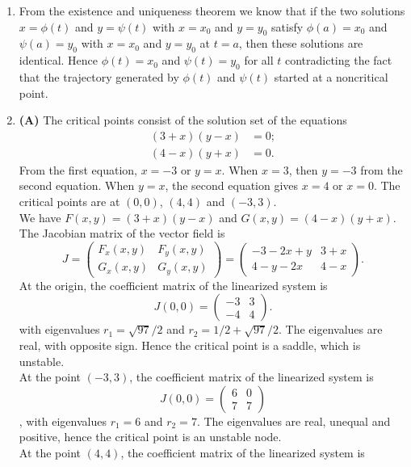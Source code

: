 \documentclass[11pt,a4paper]{article}
\begin{document}
\begin{enumerate}
		\item From the existence and uniqueness theorem we know that if the two solutions $x = \phi(t)$ and $y = \psi(t)$ with $x = x_0$ and $y = y_0$ satisfy $\phi(a) = x_0$ and $\psi(a) = y_0$ with $x = x_0$ and $y = y_0$ at $t = a$, then these solutions are identical. Hence $\phi(t) = x_0$ and $\psi(t) = y_0$ for all $t$ contradicting the fact that the trajectory generated by $\phi(t)$ and $\psi(t)$ started at a noncritical point.
		\item \textbf{(A)} The critical points consist of the solution set of the equations
		\begin{align*}
			(3 + x)(y-x) &= 0;\\
			(4 - x)(y + x) &= 0.
		\end{align*}
		From the first equation, $x = -3$ or $y = x$. When $x = 3$, then $y = -3$ from the second equation. When $y = x$, the second equation gives $x = 4$ or $x = 0$. The critical points are at $(0, 0)$, $(4, 4)$ and $(-3, 3)$.\\
		We have $F(x, y) = (3 + x)(y - x)$ and $G(x, y) = (4 - x)(y + x)$. The Jacobian matrix of the vector field is
		$$
		J =
		\begin{pmatrix}
			F_x(x, y) & F_y(x, y)\\
			G_x(x, y) & G_y(x, y)
		\end{pmatrix} = 
		\begin{pmatrix}
			-3 - 2x + y & 3 + x\\
			4 - y - 2x & 4 - x
		\end{pmatrix}.
		$$
		At the origin, the coefficient matrix of the linearized system is
		$$
		J(0, 0) =
		\begin{pmatrix}
			-3 & 3\\
			-4 & 4
		\end{pmatrix}.
		$$
		with eigenvalues $r_1 = \sqrt{97}/2$ and $r_2 = 1/2 + \sqrt{97}/2$. The eigenvalues are real, with opposite sign. Hence the critical point is a saddle, which is unstable.\\
		At the point $(-3, 3)$, the coefficient matrix of the linearized system is
		$$
		J(0, 0) = 
		\begin{pmatrix}
			6 & 0\\
			7 & 7
		\end{pmatrix}
		$$,
		with eigenvalues $r_1 = 6$ and $r_2 = 7$. The eigenvalues are real, unequal and positive, hence the critical point is an unstable node.\\
		At the point $(4, 4)$, the coefficient matrix of the linearized system is

\end{enumerate}
\end{document}
